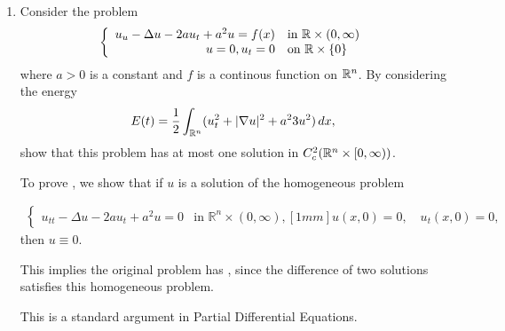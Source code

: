 \documentclass[12pt,a4paper]{report}
\begin{document}
\begin{enumerate}
\newpage
\item Consider the problem
\begin{align*}
	\left \{\begin{array}{rl}
		 u_{u} -\Delta u -2au_t+a^2u =f(x) & \text{in } \mathbb{R}\times(0,\infty)\\
		u = 0, u_t= 0 & \text{on } \mathbb{R}\times\{0\}
	\end{array} \right .
\end{align*}
where $a > 0$ is a constant and $f$ is a continous function on $\mathbb{R}^n$.  By considering the energy
\begin{align*}
	E(t) = \frac{1}{2} \int_{\mathbb{R}^n} (u_t^2+|\nabla u|^2 + a^23u^2)\,dx,
\end{align*}
show that this problem has at most one solution in $C_c^2(\mathbb{R}^n\times[0,\infty))$.

\HLINE


To prove , we show that if $u$ is a solution of the homogeneous problem

\begin{align*}
\begin{cases}
u_{tt}-\Delta u-2au_t+a^2u=0 & \text{in }\mathbb R^n\times (0,\infty),[1mm]
u(x,0)=0,\quad u_t(x,0)=0,
\end{cases}
\end{align*}
then $u\equiv 0$.

This implies the original problem has , since the difference of two solutions satisfies this homogeneous problem.

This is a standard  argument in Partial Differential Equations.

\end{enumerate}
\end{document}
